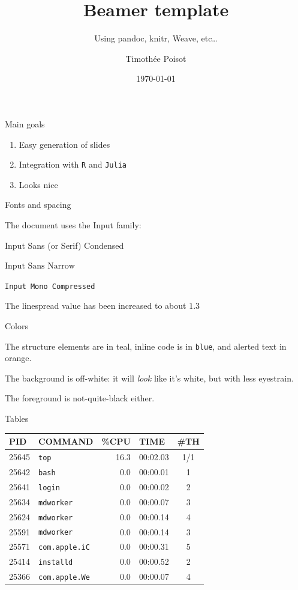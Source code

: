 \documentclass[11pt, compress, aspectratio=1610]{beamer}
\title{Beamer template}
\subtitle{Using pandoc, knitr, Weave, etc\ldots{}}
\date{\today}
\author{Timothée Poisot}
\institute{Université de Montréal}
\providecommand{\tightlist}{%
  \setlength{\itemsep}{0pt}\setlength{\parskip}{0pt}}
\let\OldTexttt\texttt
\renewcommand{\texttt}[1]{\OldTexttt{\color{plTT}#1}}
\begin{document}
\maketitle

\begin{frame}[fragile]{Main goals}

\begin{enumerate}
\def\labelenumi{\arabic{enumi}.}
\tightlist
\item
  Easy generation of slides
\item
  Integration with \texttt{R} and \texttt{Julia}
\item
  Looks nice
\end{enumerate}

\end{frame}

\begin{frame}[fragile]{Fonts and spacing}

The document uses the \alert{Input} family:

\begin{description}
\tightlist
\item[Main body]
Input Sans (or Serif) Condensed
\item[Maths]
\(\text{Input Sans Narrow}\)
\item[Code]
\texttt{Input\ Mono\ Compressed}
\end{description}

The linespread value has been increased to about \(1.3\)

\end{frame}

\begin{frame}[fragile]{Colors}

The structure elements are in teal, inline code is in \texttt{blue}, and
alerted text in \alert{orange}.

The background is off-white: it will \emph{look} like it's white, but
with less eyestrain.

The foreground is not-quite-black either.

\end{frame}

\begin{frame}[fragile]{Tables}

\begin{longtable}[]{@{}llrlc@{}}
\toprule
PID & COMMAND & \%CPU & TIME & \#TH\tabularnewline
\midrule
\endhead
25645 & \texttt{top} & 16.3 & 00:02.03 & 1/1\tabularnewline
25642 & \texttt{bash} & 0.0 & 00:00.01 & 1\tabularnewline
25641 & \texttt{login} & 0.0 & 00:00.02 & 2\tabularnewline
25634 & \texttt{mdworker} & 0.0 & 00:00.07 & 3\tabularnewline
25624 & \texttt{mdworker} & 0.0 & 00:00.14 & 4\tabularnewline
25591 & \texttt{mdworker} & 0.0 & 00:00.14 & 3\tabularnewline
25571 & \texttt{com.apple.iC} & 0.0 & 00:00.31 & 5\tabularnewline
25414 & \texttt{installd} & 0.0 & 00:00.52 & 2\tabularnewline
25366 & \texttt{com.apple.We} & 0.0 & 00:00.07 & 4\tabularnewline
\bottomrule
\end{longtable}

\end{frame}
\end{document}
